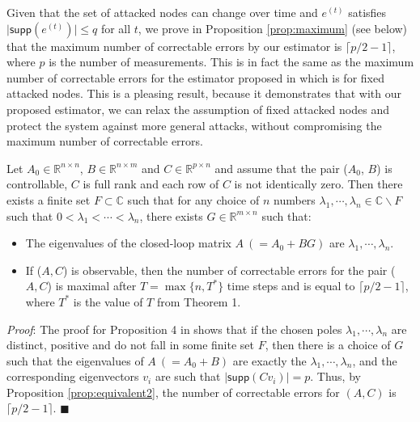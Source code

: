 \documentclass[../../thesis.tex]{subfiles}
\begin{document}
Given that the set of attacked nodes can change over time and $e^{(t)}$ satisfies $\lvert \textsf{supp} (e^{(t)}) \rvert \le q$ for all $t$, we prove in Proposition \ref{prop:maximum} (see below) that the maximum number of correctable errors by our estimator is $\lceil p/2-1 \rceil$, where $p$ is the number of measurements. This is in fact the same as the maximum number of correctable errors for the estimator proposed in \cite{Fawzi:2014} which is for fixed attacked nodes.
This is a pleasing result, because it demonstrates that with our proposed estimator, we can relax the assumption of fixed attacked nodes and protect the system against more general attacks, without compromising the maximum number of correctable errors. 
\begin{proposition}\label{prop:maximum} 
Let $A_0 \in \mathbb{R}^{n \times n}$, $B \in \mathbb{R}^{n \times m}$ and $C \in \mathbb{R}^{p \times n}$ and assume that the pair ($A_0$, $B$) is controllable, $C$ is full rank and each row of $C$ is not identically zero. Then there exists a finite set $F \subset \mathbb{C}$ such that for any choice of $n$ numbers $\lambda_1, \cdots, \lambda_n \in \mathbb{C} \backslash F$ such that $0<\lambda_1< \cdots < \lambda_n$, there exists $G \in \mathbb{R}^{m \times n}$ such that:

\begin{itemize}
\item
The eigenvalues of the closed-loop matrix $A~(= A_0+BG)$ are $\lambda_1, \cdots, \lambda_n$.
\item
If ($A, C$) is observable, then the number of correctable errors for the pair ($A, C$) is maximal after $T= \max\{n, T^*\}$ time steps and is equal to $\lceil p/2-1 \rceil$, where $T^*$ is the value of $T$ from Theorem 1. 
\end{itemize}
\end{proposition}

\textit{Proof}:
The proof for Proposition 4 in \cite{Fawzi:2014} shows that if the chosen poles $\lambda_1, \cdots, \lambda_n$ are distinct, positive and do not fall in some finite set $F$, then there is a choice of $G$ such that the eigenvalues of $A~(=A_0+B)$ are exactly the $\lambda_1, \cdots, \lambda_n$, and the corresponding eigenvectors $v_i$ are such that $\lvert \textsf{supp} (C v_i) \rvert = p$. Thus, by Proposition \ref{prop:equivalent2}, the number of correctable errors for $(A,C)$ is $\lceil p/2-1 \rceil$. \hfill$\blacksquare$
\end{document}
